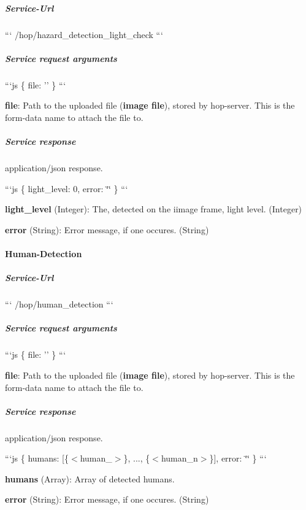 \subparagraph*{Service-\/\-Url}

``` /hop/hazard\-\_\-detection\-\_\-light\-\_\-check ```

\subparagraph*{Service request arguments}

```js \{ file\-: '' \} ```


\begin{DoxyItemize}
\item {\bfseries file}\-: Path to the uploaded file ({\bfseries image file}), stored by hop-\/server. This is the form-\/data name to attach the file to.
\end{DoxyItemize}

\subparagraph*{Service response}

application/json response.

```js \{ light\-\_\-level\-: 0, error\-: \char`\"{}\char`\"{} \} ```


\begin{DoxyItemize}
\item {\bfseries light\-\_\-level} (Integer)\-: The, detected on the iimage frame, light level. (Integer)
\item {\bfseries error} (String)\-: Error message, if one occures. (String)
\end{DoxyItemize}

\paragraph*{Human-\/\-Detection}

\subparagraph*{Service-\/\-Url}

``` /hop/human\-\_\-detection ```

\subparagraph*{Service request arguments}

```js \{ file\-: '' \} ```


\begin{DoxyItemize}
\item {\bfseries file}\-: Path to the uploaded file ({\bfseries image file}), stored by hop-\/server. This is the form-\/data name to attach the file to.
\end{DoxyItemize}

\subparagraph*{Service response}

application/json response.

```js \{ humans\-: \mbox{[}\{$<$human\-\_$>$\}, ..., \{$<$human\-\_\-n$>$\}\mbox{]}, error\-: \char`\"{}\char`\"{} \} ```


\begin{DoxyItemize}
\item {\bfseries humans} (Array)\-: Array of detected humans.
\item {\bfseries error} (String)\-: Error message, if one occures. (String)
\end{DoxyItemize}

